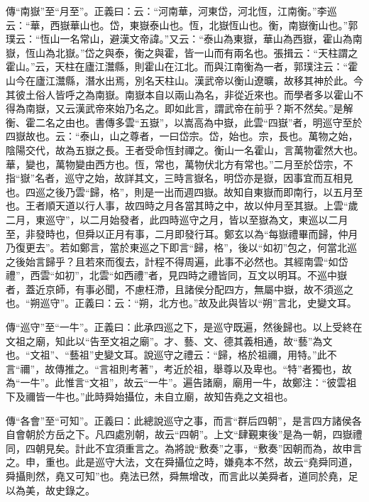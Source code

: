 {\noindent\zhuan{}\fzbyks 傳“南嶽”至“月至”。正義曰：云：“河南華，河東岱，河北恆，江南衡。”李巡云：“華，西嶽華山也。岱，東嶽泰山也。恆，北嶽恆山也。衡，南嶽衡山也。”郭璞云：“恆山一名常山，避漢文帝諱。”又云：“泰山為東嶽，華山為西嶽，霍山為南嶽，恆山為北嶽。”岱之與泰，衡之與霍，皆一山而有兩名也。張揖云：“天柱謂之霍山。”云，天柱在廬江灊縣，則霍山在江北。而與江南衡為一者，郭璞注云：“霍山今在廬江灊縣，潛水出焉，別名天柱山。漢武帝以衡山遼曠，故移其神於此。今其彼土俗人皆呼之為南嶽。南嶽本自以兩山為名，非從近來也。而學者多以霍山不得為南嶽，又云漢武帝來始乃名之。即如此言，謂武帝在前乎？斯不然矣。”是解衡、霍二名之由也。書傳多雲“五嶽”，以嵩高為中嶽，此雲“四嶽”者，明巡守至於四嶽故也。云：“泰山，山之尊者，一曰岱宗。岱，始也。宗，長也。萬物之始，陰陽交代，故為五嶽之長。王者受命恆封禪之。衡山一名霍山，言萬物霍然大也。華，變也，萬物變由西方也。恆，常也，萬物伏北方有常也。”二月至於岱宗，不指“嶽”名者，巡守之始，故詳其文，三時言嶽名，明岱亦是嶽，因事宜而互相見也。四巡之後乃雲“歸，格”，則是一出而週四嶽。故知自東嶽而即南行，以五月至也。王者順天道以行人事，故四時之月各當其時之中，故以仲月至其嶽。上雲“歲二月，東巡守”，以二月始發者，此四時巡守之月，皆以至嶽為文，東巡以二月至，非發時也，但舜以正月有事，二月即發行耳。鄭玄以為“每嶽禮畢而歸，仲月乃復更去”。若如鄭言，當於東巡之下即言“歸，格”，後以“如初”包之，何當北巡之後始言歸乎？且若來而復去，計程不得周遍，此事不必然也。其經南雲“如岱禮”，西雲“如初”，北雲“如西禮”者，見四時之禮皆同，互文以明耳。不巡中嶽者，蓋近京師，有事必聞，不慮枉滯，且諸侯分配四方，無屬中嶽，故不須巡之也。“朔巡守”。正義曰：云：“朔，北方也。”故及此與皆以“朔”言北，史變文耳。 \par}

{\noindent\zhuan{}\fzbyks 傳“巡守”至“一牛”。正義曰：此承四巡之下，是巡守既遍，然後歸也。以上受終在文祖之廟，知此以“告至文祖之廟”。才、藝、文、德其義相通，故“藝”為文也。“文祖”、“藝祖”史變文耳。說巡守之禮云：“歸，格於祖禰，用特。”此不言“禰”，故傳推之。“言祖則考著”，考近於祖，舉尊以及卑也。“特”者獨也，故為“一牛”。此惟言“文祖”，故云“一牛”。遍告諸廟，廟用一牛，故鄭注：“彼雲祖下及禰皆一牛也。”此時舜始攝位，未自立廟，故知告堯之文祖也。 \par}

{\noindent\zhuan{}\fzbyks 傳“各會”至“可知”。正義曰：此總說巡守之事，而言“群后四朝”，是言四方諸侯各自會朝於方岳之下。凡四處別朝，故云“四朝”。上文“肆覲東後”是為一朝，四嶽禮同，四朝見矣。計此不宜須重言之。為將說“敷奏”之事，“敷奏”因朝而為，故申言之。申，重也。此是巡守大法，文在舜攝位之時，嫌堯本不然，故云“堯舜同道，舜攝則然，堯又可知”也。堯法已然，舜無增改，而言此以美舜者，道同於堯，足以為美，故史錄之。 \par}

